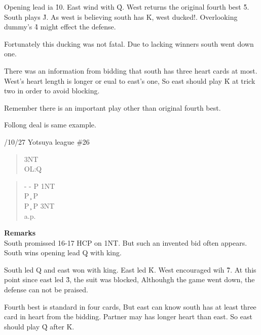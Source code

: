 Opening lead ia \h 10. East wind with \h Q. West 
returns the original fourth best \h 5. South plays \h J.
As west is believing south has \h K, west ducked!.
Overlooking dummy's \h 4 might effect the defense.

Fortunately this ducking was not fatal. Due to lacking winners 
south went down one.

There was an information from bidding that
south has three heart cards at most. West's heart length 
is longer or eual to east's one, So east should play \h K
at trick two in order to avoid blocking.

Remember there is an important play other than 
original fourth best.


Follong deal is same example.

\vspace{0.5cm}
/10/27 Yotsuya league \#26
\begin{quote}
  {\begin{minipage}[t]{\br}
     3NT\\OL:\d Q
  \end{minipage}}%
  {}%
  {}
  {}%
  {}%
\end{quote}
\begin{quote}
\begin{bidding}
- \> -  \> P \> 1NT  \\
P \c \> P \d\\
P \c \> P \> 3NT \\
a.p.
\end{bidding}
\end{quote}
{\bf Remarks}\\

South promissed 16-17 HCP on 1NT. But such an invented bid
often appears. South wins opening lead \d Q with king.

South led \s Q and east won with king. East led \h K.
West encouraged wih \h 7. At this point since east led \h 3,
the suit was blocked, Althouhgh the game went down, the defense 
can not be praised. 

Fourth best is standard in four cards, But east can know south
has at least three card in heart from the bidding. Partner may
has longer heart than east. So east should  play \h Q 
after \h K.

